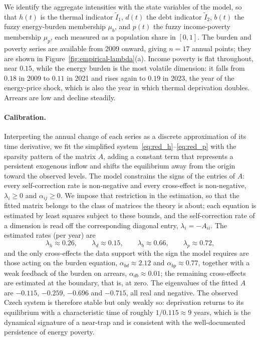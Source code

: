 \documentclass[11pt,a4paper]{article}
\begin{document}
We identify the aggregate intensities with the state variables of the model, so that $h(t)$ is the thermal indicator $\tilde I_1$, $d(t)$ the debt indicator $\tilde I_2$, $b(t)$ the fuzzy energy-burden membership $\mu_b$, and $p(t)$ the fuzzy income-poverty membership $\mu_p$, each measured as a population share in $[0,1]$. The burden and poverty series are available from 2009 onward, giving $n=17$ annual points; they are shown in Figure~\ref{fig:empirical-lambda}(a). Income poverty is flat throughout, near $0.15$, while the energy burden is the most volatile dimension: it falls from $0.18$ in 2009 to $0.11$ in 2021 and rises again to $0.19$ in 2023, the year of the energy-price shock, which is also the year in which thermal deprivation doubles. Arrears are low and decline steadily.

\paragraph{Calibration.}
Interpreting the annual change of each series as a discrete approximation of its time derivative, we fit the simplified system~\eqref{eq:red_h}--\eqref{eq:red_p} with the sparsity pattern of the matrix $A$, adding a constant term that represents a persistent exogenous inflow and shifts the equilibrium away from the origin toward the observed levels. The model constrains the signs of the entries of $A$: every self-correction rate is non-negative and every cross-effect is non-negative, $\lambda_i\ge0$ and $\alpha_{ij}\ge0$. We impose that restriction in the estimation, so that the fitted matrix belongs to the class of matrices the theory is about; each equation is estimated by least squares subject to these bounds, and the self-correction rate of a dimension is read off the corresponding diagonal entry, $\lambda_i=-A_{ii}$. The estimated rates (per year) are
\[
\lambda_h\approx0.26,\qquad
\lambda_d\approx0.15,\qquad
\lambda_b\approx0.66,\qquad
\lambda_p\approx0.72,
\]
and the only cross-effects the data support with the sign the model requires are those acting on the burden equation, $\alpha_{bd}\approx2.12$ and $\alpha_{bp}\approx0.77$, together with a weak feedback of the burden on arrears, $\alpha_{db}\approx0.01$; the remaining cross-effects are estimated at the boundary, that is, at zero. The eigenvalues of the fitted $A$ are $-0.115$, $-0.259$, $-0.696$ and $-0.715$, all real and negative. The observed Czech system is therefore stable but only weakly so: deprivation returns to its equilibrium with a characteristic time of roughly $1/0.115\approx9$ years, which is the dynamical signature of a near-trap and is consistent with the well-documented persistence of energy poverty.
\end{document}
